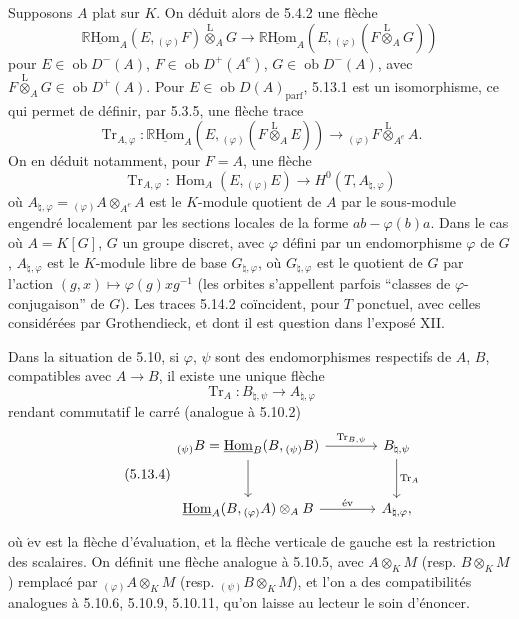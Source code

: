 \documentclass[11pt]{article}
\DeclareMathOperator{\Hom}{Hom}
\newcommand{\R}{\mathbb{R}}\newcommand{\RHomCore}{\mathbb{R}\mathrm{Hom}}
\newcommand{\ob}{\operatorname{ob}}
\providecommand{\RHom}{\RHomCore}
\providecommand{\uRHom}{\underline{\RHom}}
\providecommand{\uHom}{\underline{\Hom}}
\providecommand{\Tr}{\operatorname{Tr}}
\providecommand{\Tr}{\operatorname{Tr}}
\providecommand{\lten}{\overset{\mathrm L}{\otimes}}
\providecommand{\Tr}{\operatorname{Tr}}
\providecommand{\RHom}{\RHomCore}
\providecommand{\Hom}{\operatorname{Hom}}
\providecommand{\ob}{\operatorname{ob}}
\providecommand{\lten}{\overset{\mathrm L}{\otimes}}
\providecommand{\RHom}{\R\mathcal{H}om}
\providecommand{\lten}{\overset{\mathrm L}{\otimes}}
\providecommand{\R}{\mathrm R}
\providecommand{\Tr}{\operatorname{Tr}}
\providecommand{\lten}{\overset{\mathrm L}{\otimes}}
\providecommand{\lten}{\overset{\mathrm L}{\otimes}}
\providecommand{\lten}{\overset{\mathrm L}{\otimes}}
\providecommand{\RHom}{\RHomCore}
\providecommand{\Hom}{\operatorname{Hom}}
\providecommand{\Tr}{\operatorname{Tr}}
\providecommand{\lten}{\overset{\mathrm L}{\otimes}}
\begin{document}
Supposons $A$ plat sur $K$. On déduit alors de 5.4.2 une flèche
\begin{equation}\tag{5.13.1}
\uRHom_A(E,{}_{(\varphi)}F)\lten_AG\longrightarrow\uRHom_A(E,{}_{(\varphi)}(F\lten_AG))
\end{equation}
pour $E\in\ob D^-(A)$, $F\in\ob D^+(A^e)$, $G\in\ob D^-(A)$, avec $F\lten_AG\in\ob D^+(A)$. Pour $E\in\ob D(A)_{\mathrm{parf}}$, 5.13.1 est un isomorphisme, ce qui permet de définir, par 5.3.5, une flèche trace
\begin{equation}\tag{5.13.2}
\Tr_{A,\varphi}:\uRHom_A(E,{}_{(\varphi)}(F\lten_AE))\longrightarrow {}_{(\varphi)}F\lten_{A^e}A.
\end{equation}
On en déduit notamment, pour $F=A$, une flèche
\begin{equation}\tag{5.13.3}
\Tr_{A,\varphi}:\Hom_A(E,{}_{(\varphi)}E)\longrightarrow H^0(T,A_{\natural,\varphi})
\end{equation}
où $A_{\natural,\varphi}={}_{(\varphi)}A\otimes_{A^e}A$ est le $K$-module quotient de $A$ par le sous-module engendré localement par les sections locales de la forme $ab-\varphi(b)a$. Dans le cas où $A=K[G]$, $G$ un groupe discret, avec $\varphi$ défini par un endomorphisme $\varphi$ de $G$, $A_{\natural,\varphi}$ est le $K$-module libre de base $G_{\natural,\varphi}$, où $G_{\natural,\varphi}$ est le quotient de $G$ par l'action $(g,x)\mapsto\varphi(g)xg^{-1}$ (les orbites s'appellent parfois ``classes de $\varphi$-conjugaison'' de $G$). Les traces 5.14.2 coïncident, pour $T$ ponctuel, avec celles considérées par Grothendieck, et dont il est question dans l'exposé XII.

Dans la situation de 5.10, si $\varphi$, $\psi$ sont des endomorphismes respectifs de $A$, $B$, compatibles avec $A\to B$, il existe une unique flèche
\[
\Tr_A:B_{\natural,\psi}\longrightarrow A_{\natural,\varphi}
\]
rendant commutatif le carré (analogue à 5.10.2)
\begin{equation}\tag{5.13.4}
\begin{tikzcd}[column sep=large,row sep=large]
{}_{(\psi)}B=\uHom_B(B,{}_{(\psi)}B) \arrow[r,"\Tr_{B,\psi}"] \arrow[d] & B_{\natural,\psi} \arrow[d,"\Tr_A"]\\
\uHom_A(B,{}_{(\varphi)}A)\otimes_AB \arrow[r,"\mathrm{\acute{e}v}"] & A_{\natural,\varphi},
\end{tikzcd}
\end{equation}
où $\mathrm{\acute{e}v}$ est la flèche d'évaluation, et la flèche verticale de gauche est la restriction des scalaires. On définit une flèche analogue à 5.10.5, avec $A\otimes_KM$ (resp. 
$B\otimes_KM$)
remplacé par ${}_{(\varphi)}A\otimes_KM$ (resp. ${}_{(\psi)}B\otimes_KM$), et l'on a des compatibilités analogues à 5.10.6, 5.10.9, 5.10.11, qu'on laisse au lecteur le soin d'énoncer.
\end{document}
